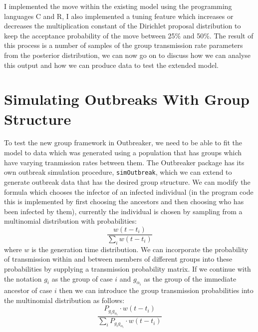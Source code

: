 \documentclass[11pt,a4paper]{report}
\begin{document}
I implemented the move within the existing model using the programming languages C and R, I also implemented a tuning feature which increases or decreases the multiplication constant of the Dirichlet proposal distribution to keep the acceptance probability of the move between 25\% and 50\%. The result of this process is a number of samples of the group transmission rate parameters from the posterior distribution, we can now go on to discuss how we can analyse this output and how we can produce data to test the extended model.




\section{Simulating Outbreaks With Group Structure}
To test the new group framework in Outbreaker, we need to be able to fit the model to data which was generated using a population that has groups which have varying tranmission rates between them.
The Outbreaker package has its own outbreak simulation procedure, {\tt simOutbreak}, which we can extend to generate outbreak data that has the desired group structure. We can modify the formula which chooses the infector of an infected individual (in the program code this is implemented by first choosing the ancestors and then choosing who has been infected by them), currently the individual is chosen by sampling from a multinomial distribution with probabilities:
\begin{equation}
 \frac{w(t-t_i)}{\sum_i{w(t-t_i)}}
\end{equation}
where $w$ is the generation time distribution. We can incorporate the probability of transmission within and between members of different groups into these probabilities by supplying a transmission probability matrix. If we continue with the notation $g_{i}$ as the group of case $i$ and $g_{\alpha_{i}}$ as the group of the immediate ancestor of case $i$ then we can introduce the group transmission probabilities into the multinomial distribution as follows:
\begin{equation}
 \frac{P_{g_{i}g_{\alpha_{i}}} \cdot w(t-t_i)}{\sum_i{P_{g_{i}g_{\alpha_{i}}} \cdot w(t-t_i)}}
\end{equation}
\end{document}
